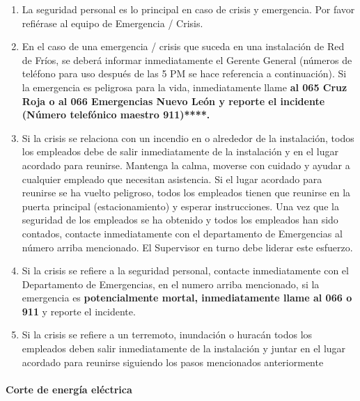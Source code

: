 \begin{enumerate}
	\item La seguridad personal es lo principal en caso de crisis y emergencia. Por favor refiérase al equipo de Emergencia / Crisis.
	\item En el caso de una emergencia / crisis que suceda en una instalación de Red de Fríos, se deberá informar inmediatamente el Gerente General (números de teléfono para uso después de las 5 PM se hace referencia a continuación). Si la emergencia es peligrosa para la vida, inmediatamente llame \textbf{al 065 Cruz Roja o al 066 Emergencias Nuevo León y reporte el incidente (Número telefónico maestro 911)****.}
	\item Si la crisis se relaciona con un incendio en o alrededor de la instalación, todos los empleados debe de salir inmediatamente de la instalación y en el lugar acordado para reunirse. Mantenga la calma, moverse con cuidado y ayudar a cualquier empleado que necesitan asistencia. Si el lugar acordado para reunirse se ha vuelto peligroso, todos los empleados tienen que reunirse en la puerta principal (estacionamiento) y esperar instrucciones. Una vez que la seguridad de los empleados se ha obtenido y todos los empleados han sido contados, contacte inmediatamente con el departamento de Emergencias al número arriba mencionado. El Supervisor en turno debe liderar este esfuerzo.
	\item Si la crisis se refiere a la seguridad personal, contacte inmediatamente con el Departamento de Emergencias, en el numero arriba mencionado, si la emergencia es \textbf{potencialmente mortal, inmediatamente llame al 066 o 911} y reporte el incidente.
	\item Si la crisis se refiere a un terremoto, inundación o huracán todos los empleados deben salir inmediatamente de la instalación y juntar en el lugar acordado para reunirse siguiendo los pasos mencionados anteriormente
\end{enumerate}

\paragraph{Corte de energía eléctrica}

